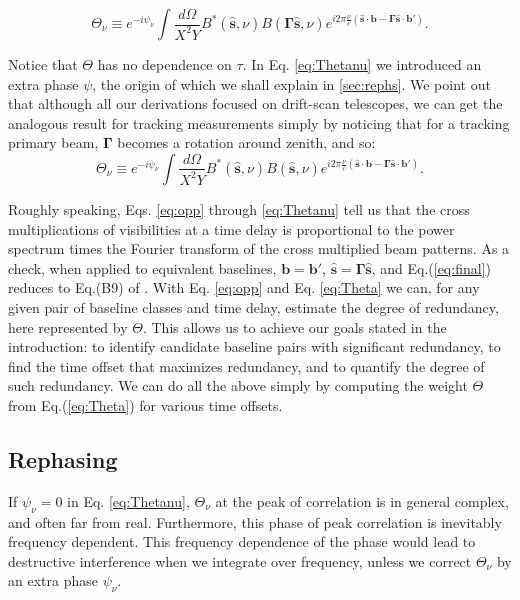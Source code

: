 \documentclass[twocolumn,apj,numberedappendix]{emulateapj}
\renewcommand\[{\begin{equation}}
\renewcommand\]{\end{equation}}
\begin{document}
\[
\Theta_{\nu} \equiv e^{-i\psi_{\nu}} \int \frac{d\Omega}{X^{2}Y}B^{*}(\hat{\boldsymbol{s}},\nu)B(\boldsymbol{\Gamma}\hat{\boldsymbol{s}},\nu) e^{i2\pi\frac{\nu}{c}\left(\hat{\boldsymbol{s}}\cdot\boldsymbol{b}-\boldsymbol{\Gamma}\hat{\boldsymbol{s}}\cdot\boldsymbol{b'}\right)}.
\label{eq:Thetanu}
\]


Notice that $\Theta$ has no dependence on $\tau$. In Eq. \eqref{eq:Thetanu} we introduced an extra phase $\psi$, the origin of which we shall explain in \ref{sec:rephs}. We point out that although all our derivations focused on drift-scan telescopes, we can get the analogous result for tracking measurements simply by noticing that for a tracking primary beam, $\boldsymbol{\Gamma}$ becomes a rotation around zenith, and so:
\[
\Theta_{\nu} \equiv e^{-i\psi_{\nu}} \int \frac{d\Omega}{X^{2}Y}B^{*}(\hat{\boldsymbol{s}},\nu)B(\hat{\boldsymbol{s}},\nu) e^{i2\pi\frac{\nu}{c}\left(\hat{\boldsymbol{s}}\cdot\boldsymbol{b}-\boldsymbol{\Gamma}\hat{\boldsymbol{s}}\cdot\boldsymbol{b'}\right)}.
\label{eq:Thetanu_tracking}
\]

Roughly speaking, Eqs. \eqref{eq:opp} through \eqref{eq:Thetanu} tell us that the cross multiplications of visibilities at a time delay is proportional to the power spectrum times the Fourier
transform of the cross multiplied beam patterns. As a check, when applied to equivalent baselines,
$\boldsymbol{b}=\boldsymbol{b'}$, $\hat{\boldsymbol{s}}=\boldsymbol{\Gamma}\hat{\boldsymbol{s}}$, and Eq.(\ref{eq:final}) reduces to Eq.(B9) of \cite{paper32}. 
With Eq. \eqref{eq:opp} and Eq. \eqref{eq:Theta} we can, for any given pair of baseline classes and time delay, estimate the degree of redundancy, here represented by $\Theta$. This allows us to achieve our goals stated in the introduction: to identify 
candidate baseline pairs with significant redundancy, to find the time offset that maximizes redundancy, and to quantify the degree of such redundancy. We can do all the above simply by computing the weight $\Theta$ from
Eq.(\ref{eq:Theta}) for various time offsets. 



\subsection{Rephasing \label{sec:rephs}}
If $\psi_{\nu}=0$ in  Eq. \eqref{eq:Thetanu}, $\Theta_{\nu}$ at the peak of correlation is in general complex, and often far from real. Furthermore, this phase of peak correlation is inevitably frequency dependent. This frequency dependence of the phase would lead to destructive interference when we integrate over frequency, unless we correct $\Theta_{\nu}$ by an extra phase $\psi_\nu$. 
\end{document}
